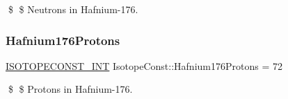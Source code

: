 \$ \$ Neutrons in Hafnium-\/176. \mbox{\label{group___isotope_const-_hafnium-_hf176_gac1e0b62f6693c858732651f0dfcf4865}} 
\subsubsection{\texorpdfstring{Hafnium176\+Protons}{Hafnium176Protons}}
{\footnotesize\ttfamily \mbox{\hyperlink{group___isotope_const-_macros_ga5f18360b3e99483a35c32d789e62621c}{I\+S\+O\+T\+O\+P\+E\+C\+O\+N\+S\+T\+\_\+\+I\+NT}} Isotope\+Const\+::\+Hafnium176\+Protons = 72}

\$ \$ Protons in Hafnium-\/176. 